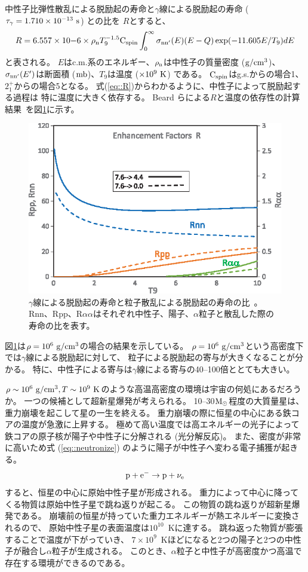 中性子比弾性散乱による脱励起の寿命と$\gamma$線による脱励起の寿命 ($\tau_{\gamma} = 1.710\times10^{-13}~{\rm s}$) との比を
$R$とすると、
\begin{equation}
  R = 6.557\times10{-6}\times\rho_{\rm n}T_{9}^{-1.5}{\rm C}_{{\rm spin}}
  \int^{\infty}_{0}\sigma_{\rm nn'}(E)(E-Q)\exp(-11.605E/T_{9})dE
  \label{eq::R}
\end{equation}
と表される。
$E$はc.m.系のエネルギー、$\rho_{\rm n}$は中性子の質量密度 (${\rm g}/{\rm cm}^{3}$)、
$\sigma_{\rm nn'}(E')$は断面積 (${\rm mb}$)、$T_{9}$は温度 ($\times10^{9}~{\rm K}$) である。
${\rm C}_{{\rm spin}}$はg.s.からの場合1、
$2_{1}^{+}$からの場合5となる。
式(\ref{eq::R})からわかるように、中性子によって脱励起する過程は
特に温度に大きく依存する。
Beard らによる$R$と温度の依存性の計算結果~\cite{hotdensemedium}を図\ref{fig::R}に示す。
\begin{figure}
  \centering
  \includegraphics[clip, width=0.6\columnwidth]{eps/R_T.eps}
  \caption[$\gamma$線による脱励起の寿命と粒子散乱による脱励起の寿命の比。]
          {$\gamma$線による脱励起の寿命と粒子散乱による脱励起の寿命の比~\cite{hotdensemedium}。
    Rnn、Rpp、R$\alpha\alpha$はそれぞれ中性子、陽子、$\alpha$粒子と散乱した際の寿命の比を表す。}
  \label{fig::R}
\end{figure}
図\ref{fig::R}は$\rho = 10^{6}~{\rm g}/{\rm cm}^{3}$の場合の結果を示している。
$\rho = 10^{6}~{\rm g}/{\rm cm}^{3}$という高密度下では$\gamma$線による脱励起に対して、
粒子による脱励起の寄与が大きくなることが分かる。
特に、中性子による寄与は$\gamma$線による寄与の40--100倍ととても大きい。

$\rho\sim10^{6}~{\rm g}/{\rm cm^{3}}, T\sim10^{9}~{\rm K}$のような高温高密度の環境は宇宙の何処にあるだろうか。
一つの候補として超新星爆発が考えられる。
10--30$\rm M_{\odot}$程度の大質量星は、重力崩壊を起こして星の一生を終える。
重力崩壊の際に恒星の中心にある鉄コアの温度が急激に上昇する。
極めて高い温度では高エネルギーの光子によって鉄コアの原子核が陽子や中性子に分解される (光分解反応)。
また、密度が非常に高いため式 (\ref{eq::neutronize}) のように陽子が中性子へ変わる電子捕獲が起きる。
\begin{equation}
  {\rm p}+{\rm e}^{-} \rightarrow {\rm p}+\nu_{\rm e}
  \label{eq::neutronize}
\end{equation}
すると、恒星の中心に原始中性子星が形成される。
重力によって中心に降ってくる物質は原始中性子星で跳ね返りが起こる。
この物質の跳ね返りが超新星爆発である。
崩壊前の恒星が持っていた重力エネルギーが熱エネルギーに変換されるので、
原始中性子星の表面温度は$10^10$~Kに達する。
跳ね返った物質が膨張することで温度が下がっていき、
$7\times10^9$~Kほどになると2つの陽子と2つの中性子が融合し$\alpha$粒子が生成される。
このとき、$\alpha$粒子と中性子が高密度かつ高温で存在する環境ができるのである。

